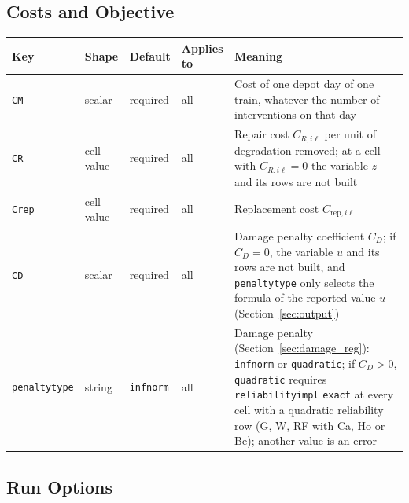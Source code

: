 \documentclass[11pt,a4paper]{article}
\makeatletter
\theoremstyle{plain}
\theoremstyle{definition}
\renewcommand{\_}{\textunderscore\allowbreak{}}
\providecommand{\keyrow}[5]{{\raggedright #1\par} & {\raggedright #2\par} & {\raggedright #3\par} & {\raggedright #4\par} & {\raggedright #5\par} \\}
\providecommand{\tabstart}[2]{\begingroup\small\begin{longtable}{@{}#1@{}}\toprule #2 \\ \midrule \endhead}
\providecommand{\tabend}{\bottomrule\end{longtable}\endgroup}
\providecommand{\keytab}{\tabstart{p{3.2cm}p{2.2cm}p{1.8cm}p{1.9cm}p{4.5cm}}{Key & Shape & Default & Applies to & Meaning}}
\makeatother
\begin{document}
\subsection{Costs and Objective}\label{sec:input_costs}

\keytab
\keyrow{\texttt{C\_M}}{scalar}{required}{all}{Cost of one depot day of one train, whatever the number of interventions on that day}
\keyrow{\texttt{C\_R}}{cell value}{required}{all}{Repair cost $C_{R,i\ell}$ per unit of degradation removed; at a cell with $C_{R,i\ell} = 0$ the variable $z$ and its rows are not built}
\keyrow{\texttt{C\_rep}}{cell value}{required}{all}{Replacement cost $C_{\mathrm{rep},i\ell}$}
\keyrow{\texttt{C\_D}}{scalar}{required}{all}{Damage penalty coefficient $C_D$; if $C_D = 0$, the variable $u$ and its rows are not built, and \texttt{penalty\_type} only selects the formula of the reported value $u$ (Section~\ref{sec:output})}
\keyrow{\texttt{penalty\_type}}{string}{\texttt{inf\_norm}}{all}{Damage penalty (Section~\ref{sec:damage_reg}): \texttt{inf\_norm} or \texttt{quadratic}; if $C_D > 0$, \texttt{quadratic} requires \texttt{reliability\_impl} \texttt{exact} at every cell with a quadratic reliability row (G, W, RF with Ca, Ho or Be); another value is an error}
\tabend

\subsection{Run Options}\label{sec:run_options}
\end{document}
